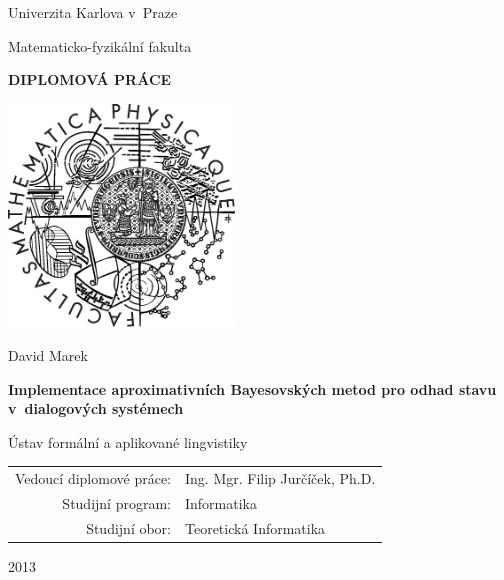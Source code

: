 \documentclass[12pt,a4paper]{report}
\begin{document}



\pagestyle{empty}
\begin{center}

\large

Univerzita Karlova v~Praze

\medskip

Matematicko-fyzikální fakulta

\vfill

{\bf\Large DIPLOMOVÁ PRÁCE}

\vfill

\centerline{\mbox{\includegraphics[width=60mm]{../img/logo.eps}}}

\vfill
\vspace{5mm}

{\LARGE David Marek}

\vspace{15mm}

{\LARGE\bfseries Implementace aproximativních Bayesovských metod pro odhad stavu v~dialogových systémech}

\vfill

Ústav formální a aplikované lingvistiky

\vfill

\begin{tabular}{rl}

Vedoucí diplomové práce: & Ing. Mgr. Filip Jurčíček, Ph.D. \\
\noalign{\vspace{2mm}}
Studijní program: & Informatika \\
\noalign{\vspace{2mm}}
Studijní obor: & Teoretická Informatika \\
\end{tabular}

\vfill

2013

\end{center}
\end{document}
